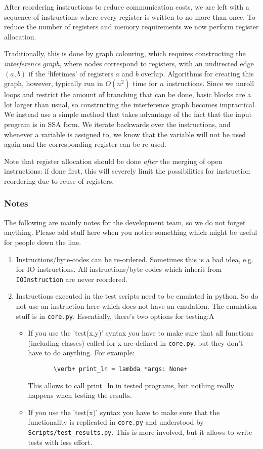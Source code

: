 After reordering instructions to reduce communication costs, we are left with
a sequence of instructions where every register is written to no more than
once. To reduce the number of registers and memory requirements we now
perform register allocation.

Traditionally, this is done by graph colouring, which requires constructing
the \emph{interference
graph}, where nodes correspond to registers, with an undirected edge $(a,b)$ if
the `lifetimes' of registers $a$ and $b$ overlap. Algorithms for creating this
graph, however, typically run in $O(n^2)$ time for $n$ instructions. Since we
unroll loops and restrict the amount of branching that can be done, basic blocks
are a lot larger than usual, so constructing the interference graph becomes
impractical. 
We instead use a simple method that takes advantage of the fact that 
the input program is in SSA form. We iterate backwards over the instructions,
and whenever a variable is assigned to, we know that the variable will not be
used again and the corresponding register can be re-used.

Note that register allocation should be done \emph{after} the merging of open
instructions: if done first, this will severely limit the possibilities for
instruction reordering due to reuse of registers.


\subsubsection{Notes}
The following are mainly notes for the development team, so we
do not forget anything. Please add stuff here when you notice
something which might be useful for people down the line.

\begin{enumerate}
\item Instructions/byte-codes can be re-ordered. Sometimes this is a bad idea,
e.g. for IO instructions. All instructions/byte-codes which inherit from
\verb+IOInstruction+ are never reordered.
\item Instructions executed in the test scripts need to be emulated in
python. So do not use an instruction here which does not have an emulation.
The emulation stuff is in \verb+core.py+.
Essentially, there's two options for testing:A
\begin{itemize}
\item If you use the 'test(x,y)' syntax you have to make sure that all functions (including classes) called for x are defined in \verb+core.py+, but they don't have to do anything. For example:
\begin{verbatim}
       \verb+ print_ln = lambda *args: None+
\end{verbatim}
This allows to call print_ln in tested programs, but nothing really happens when testing the results.
\item If you use the 'test(x)' syntax you have to make sure that the functionality is replicated in \verb+core.py+ and understood by \verb+Scripts/test_results.py+. This is more involved, but it allows to write tests with less effort.
\end{itemize}
\end{enumerate}

